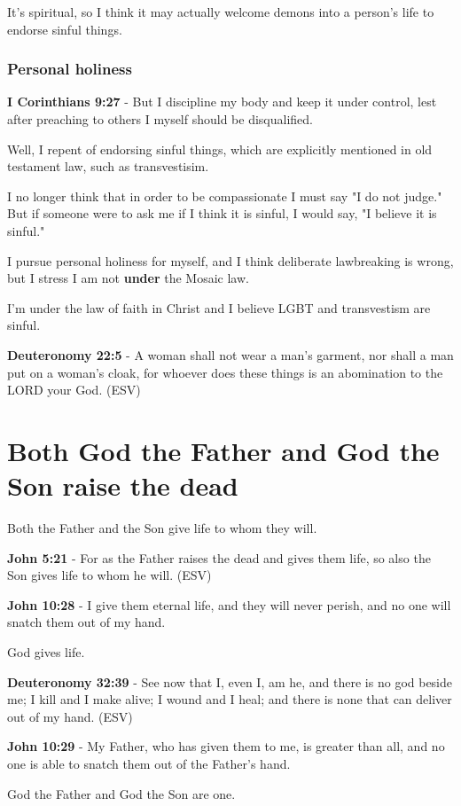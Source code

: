 \documentclass[11pt]{article}
\begin{document}
It's spiritual, so I think it may actually
welcome demons into a person's life to endorse
sinful things.

\subsubsection{Personal holiness}
\label{sec:org371ba9f}
\textbf{I Corinthians 9:27} - But I discipline my body and keep it under control, lest after preaching to others I myself should be disqualified.

Well, I repent of endorsing sinful things,
which are explicitly mentioned in old
testament law, such as transvestisim.

I no longer think that in order to be compassionate I must say "I do not judge."
But if someone were to ask me if I think it is sinful, I would say, "I believe it is sinful."

I pursue personal holiness for myself, and I
think deliberate lawbreaking is wrong,
but I stress I am not \textbf{under} the Mosaic law.

I'm under the law of faith in Christ and I believe
LGBT and transvestism are sinful.

\textbf{Deuteronomy 22:5} - A woman shall not wear a man's garment, nor shall a man put on a woman's cloak, for whoever does these things is an abomination to the LORD your God. (ESV)

\section{Both God the Father and God the Son raise the dead}
\label{sec:orgf757db7}
Both the Father and the Son give life to whom they will.

\textbf{John 5:21} - For as the Father raises the dead and gives them life, so also the Son gives life to whom he will. (ESV)

\textbf{John 10:28} - I give them eternal life, and they will never perish, and no one will snatch them out of my hand.

God gives life.

\textbf{Deuteronomy 32:39} - See now that I, even I, am he, and there is no god beside me; I kill and I make alive; I wound and I heal; and there is none that can deliver out of my hand. (ESV)

\textbf{John 10:29} - My Father, who has given them to me, is greater than all, and no one is able to snatch them out of the Father's hand.

God the Father and God the Son are one.
\end{document}
